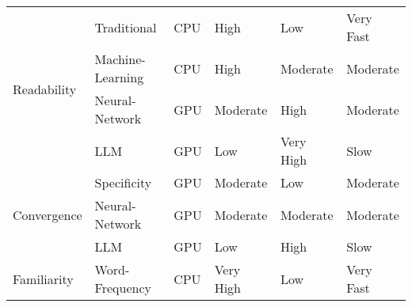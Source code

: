 \begin{table}[t]
{\begin{tabular}{@{}llllll@{}}
\multirow{4}{*}{Readability}   & Traditional      & CPU                                                                            & High                                                                             & Low       & Very Fast                                                                     \\
                               & Machine-Learning & CPU                                                                            & High                                                                             & Moderate  & Moderate                                                                      \\
                               & Neural-Network   & GPU                                                                            & Moderate                                                                         & High      & Moderate                                                                      \\
                               & LLM              & GPU                                                                            & Low                                                                              & Very High & Slow                                                                          \\ \midrule
\multirow{3}{*}{Convergence}   & Specificity      & GPU                                                                            & Moderate                                                                         & Low       & Moderate                                                                      \\
                               & Neural-Network   & GPU                                                                            & Moderate                                                                         & Moderate  & Moderate                                                                      \\
                               & LLM              & GPU                                                                            & Low                                                                              & High      & Slow                                                                          \\ \midrule
\multirow{2}{*}{Familiarity}   & Word-Frequency   & CPU                                                                            & Very High                                                                        & Low       & Very Fast                                                                     \\

\end{tabular}}
\end{table}

